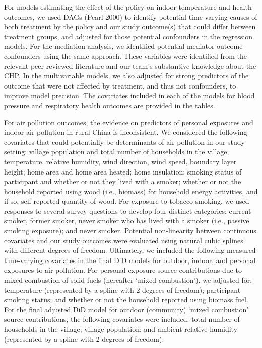 \documentclass[
  letterpaper,
  DIV=11,
  numbers=noendperiod]{scrartcl}
\begin{document}
For models estimating the effect of the policy on indoor temperature and
health outcomes, we used DAGs (Pearl 2000) to identify potential
time-varying causes of both treatment by the policy and our study
outcome(s) that could differ between treatment groups, and adjusted for
those potential confounders in the regression models. For the mediation
analysis, we identified potential mediator-outcome confounders using the
same approach. These variables were identified from the relevant
peer-reviewed literature and our team's substantive knowledge about the
CHP. In the multivariable models, we also adjusted for strong predictors
of the outcome that were not affected by treatment, and thus not
confounders, to improve model precision. The covariates included in each
of the models for blood pressure and respiratory health outcomes are
provided in the tables.

For air pollution outcomes, the evidence on predictors of personal
exposures and indoor air pollution in rural China is inconsistent. We
considered the following covariates that could potentially be
determinants of air pollution in our study setting: village population
and total number of households in the village; temperature, relative
humidity, wind direction, wind speed, boundary layer height; home area
and home area heated; home insulation; smoking status of participant and
whether or not they lived with a smoker; whether or not the household
reported using wood (i.e., biomass) for household energy activities, and
if so, self-reported quantity of wood. For exposure to tobacco smoking,
we used responses to several survey questions to develop four distinct
 categories: current smoker, former smoker, never
smoker who has lived with a smoker (i.e., passive smoking exposure); and
never smoker. Potential non-linearity between continuous covariates and
our study outcomes were evaluated using natural cubic splines with
different degrees of freedom. Ultimately, we included the following
measured time-varying covariates in the final DiD models for outdoor,
indoor, and personal exposures to air pollution. For personal exposure
source contributions due to mixed combustion of solid fuels (hereafter
`mixed combustion'), we adjusted for: temperature (represented by a
spline with 2 degrees of freedom); participant smoking status; and
whether or not the household reported using biomass fuel. For the final
adjusted DiD model for outdoor (community) `mixed combustion' source
contributions, the following covariates were included: total number of
households in the village; village population; and ambient relative
humidity (represented by a spline with 2 degrees of freedom).
\end{document}
